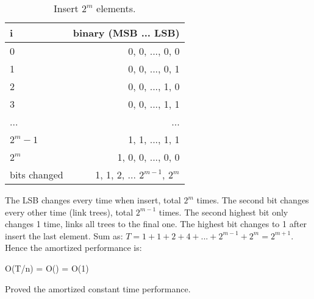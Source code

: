 \documentclass[b5paper]{article}
\begin{document}
\begin{table}[htbp]
\centering
\begin{tabular}{| l | r |}
  \hline
  i & binary (MSB ... LSB) \\
  \hline
  0 & 0, 0, ..., 0, 0 \\
  1 & 0, 0, ..., 0, 1 \\
  2 & 0, 0, ..., 1, 0 \\
  3 & 0, 0, ..., 1, 1 \\
  ... & ... \\
  $2^m-1$ & 1, 1, ..., 1, 1 \\
  $2^m$ & 1, 0, 0, ..., 0, 0 \\
  \hline
  bits changed & 1, 1, 2, ... $2^{m-1}$, $2^m$ \\
  \hline
\end{tabular}
\caption{Insert $2^m$ elements.}
\label{tab:ralist-insertion}
\end{table}

The LSB changes every time when insert, total $2^m$ times. The second bit changes every other time (link trees), total $2^{m - 1}$ times. The second highest bit only changes 1 time, links all trees to the final one. The highest bit changes to 1 after insert the last element. Sum as: $T = 1 + 1 + 2 + 4 + ... + 2^{m-1} + 2^m = 2^{m+1}$. Hence the amortized performance is:

\be
O(T/n) = O() = O(1)
\ee

Proved the amortized constant time performance.

\begin{Exercise}\label{ex:num-representaion}
\end{Exercise}
\end{document}
